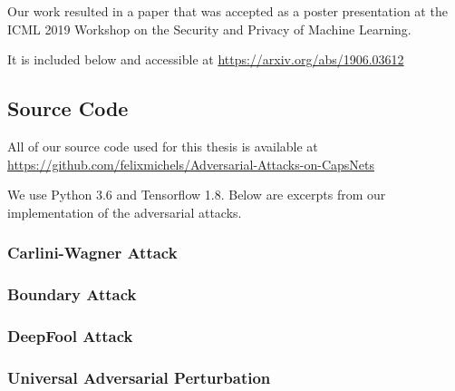 Our work resulted in a paper that was accepted as a poster presentation at the ICML 2019 Workshop on the Security and Privacy of Machine Learning.

It is included below and accessible at \url{https://arxiv.org/abs/1906.03612}



\subsection{Source Code}

All of our source code used for this thesis is available at \url{https://github.com/felixmichels/Adversarial-Attacks-on-CapsNets}

We use Python 3.6 and Tensorflow 1.8.
Below are excerpts from our implementation of the adversarial attacks.

\subsubsection{Carlini-Wagner Attack}


\subsubsection{Boundary Attack}


\subsubsection{DeepFool Attack}


\subsubsection{Universal Adversarial Perturbation}




